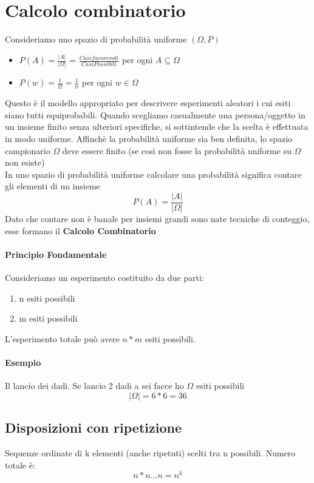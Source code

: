 \section{Calcolo combinatorio}
Consideriamo uno spazio di probabilità uniforme $(\Omega, P)$
\begin{itemize}
    \item $P(A) = \frac{|A|}{|\Omega|}$ = $\frac{Casi favorevoli}{Casi Possibili}$
    per ogni $A \subseteq \Omega$
    \item $P({w}) = \frac{1}{\Omega} = \frac{1}{n}$ per ogni $w \in \Omega$
\end{itemize}
Questo è il modello appropriato per descrivere esperimenti aleatori i cui esiti
siano tutti equiprobabili. Quando scegliamo casualmente una persona/oggetto in un 
insieme finito senza ulteriori specifiche, si sottintende che la scelta è effettuata
in modo uniforme.
Affinchè la probabilità uniforme sia ben definita, lo spazio campionario $\Omega$
deve essere finito (se così non fosse la probabilità uniforme su $\Omega$ non esiste)
\\ In uno spazio di probabilità uniforme calcolare una probabilità significa contare gli 
elementi di un insieme
\begin{equation}
    P(A) = \frac{|A|}{|\Omega|}
\end{equation}
Dato che contare non è banale per insiemi grandi sono nate tecniche di conteggio,
esse formano il \textbf{Calcolo Combinatorio}
\paragraph{Principio Fondamentale} Consideriamo un esperimento costituito da due parti:
\begin{enumerate}
    \item n esiti possibili
    \item m esiti possibili
\end{enumerate}
L'esperimento totale può avere $n*m$ esiti possibili.
\paragraph{Esempio} Il lancio dei dadi. Se lancio 2 dadi a sei facce ho $\Omega$ 
esiti possibili
\begin{equation}
    |\Omega| = 6*6 = 36
\end{equation}
\subsection{Disposizioni con ripetizione}
Sequenze ordinate di k elementi (anche ripetuti) scelti tra n possibili. Numero totale è:
\begin{equation}
    n*n \dots n = n^k
\end{equation}
